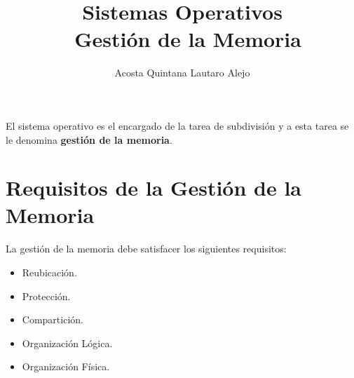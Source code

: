 \documentclass[12pt, a4paper]{article}
\title{Sistemas Operativos \\\ Gestión de la Memoria}
\author{Acosta Quintana Lautaro Alejo}
\begin{document}
\maketitle
\tableofcontents
\break

El sistema operativo es el encargado de la tarea de subdivisión y a esta tarea se le denomina \textbf{gestión de la memoria}.
\section{Requisitos de la Gestión de la Memoria}
La gestión de la memoria debe satisfacer los siguientes requisitos:
\begin{itemize}
    \item Reubicación.
    \item Protección.
    \item Compartición.
    \item Organización Lógica.
    \item Organización Física.
\end{itemize}
\end{document}
